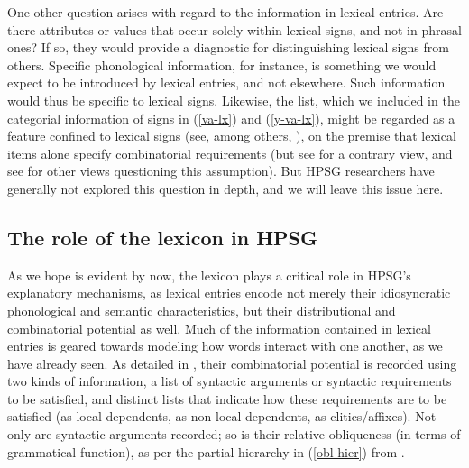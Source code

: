 \documentclass[output=paper]{langsci/langscibook}
\begin{document}
One other question arises with regard to the information in lexical entries.
Are there attributes or values that occur solely within lexical signs, and not in phrasal ones? 
If so, they would provide a diagnostic for distinguishing lexical signs from others.
Specific phonological information, for instance, is something we would expect to be introduced by lexical entries, and not elsewhere.
Such information would thus be specific to lexical signs. 
Likewise, the    list, which we included in the categorial information of signs in (\ref{va-lx}) and (\ref{y-va-lx}), might be regarded as a feature confined to lexical signs (see, among others, \citealt{GinzburgandSag2001}), on the premise that lexical items alone specify combinatorial requirements (but see \citet{Przepiorkowski2001} for a contrary view, and see  for other views questioning this assumption).
But HPSG researchers have generally not explored this question in depth, and we will leave this issue here.


\subsection{The role of the lexicon in HPSG}

As we hope is evident by now, the lexicon plays a critical role in HPSG's explanatory mechanisms, as lexical entries encode not merely their idiosyncratic phonological and semantic characteristics, but their distributional and combinatorial potential as well.
Much of the information contained in lexical entries is geared towards modeling how words interact with one another, as we have already seen. 
As detailed in , their combinatorial potential is recorded using two kinds of information, 
a list of syntactic arguments or syntactic requirements to be satisfied, and distinct lists that indicate how these requirements are to be satisfied (as local dependents, as non-local dependents, as clitics/affixes).
Not only are syntactic arguments recorded; so is their relative obliqueness (in terms of grammatical function), as per the partial hierarchy in (\ref{obl-hier}) from \citet{PollardandSag1992}. 
\end{document}
